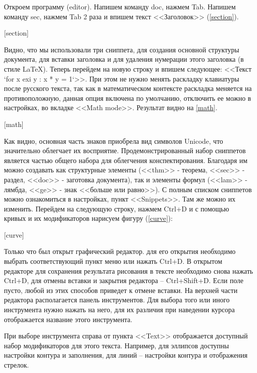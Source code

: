 \documentclass[opermanual]{espd}
\begin{document}
Откроем программу (editor). Напишем команду doc, нажмем Tab. Напишем команду sec, нажмем Tab 2 раза и впишем текст <<Заголовок>> (\ref{section}).

[section]

Видно, что мы использовали три сниппета, для создания основной структуры документа, для вставки заголовка и для удаления нумерации этого заголовка (в стиле LaTeX). Теперь перейдем на новую строку и впишем следующее: <<Текст `for x exi y : x * y = 1`>>. При этом не нужно менять раскладку клавиатуры после русского текста, так как в математическом контексте раскладка меняется на противоположную, данная опция включена по умолчанию, отключить ее можно в настройках, во вкладке <<Math mode>>. Результат видно на \ref{math}.

[math]

Как видно, основная часть знаков приобрела вид символов Unicode, что значительно облегчает их восприятие. Продемонстрированный набор сниппетов является частью общего набора для облегчения конспектирования. Благодаря им можно создавать как структурные элементы (<<thm>> - теорема, <<sec>> - раздел, <<doc>> - заготовка документа), так и элементы формул (<<lam>> - лямбда, <<ge>> - знак  <<больше или равно>>). С полным списком сниппетов можно ознакомиться в настройках, пункт <<Snippets>>. Там же можно их изменить. Перейдем на следующую строку, нажмем Ctrl+D и с помощью кривых и их модификаторов нарисуем фигуру (\ref{curve}):

[curve]

Только что был открыт графический редактор. для его открытия необходимо выбрать соответствующий пункт меню или нажать Ctrl+D. В открытом редакторе для сохранения результата рисования в тексте необходимо снова нажать Ctrl+D, для отмены вставки и закрытия редактора -- Ctrl+Shift+D. Если поле пусто, любой из этих способов приведет к отмене вставки. На верхней части редактора располагается панель инструментов. Для выбора того или иного инструмента нужно нажать на него, для их различия при наведении курсора отображается название этого инструмента.

При выборе инструмента справа от пункта <<Text>> отображается доступный набор модификаторов для этого текста. Например, для эллипсов доступны настройки контура и заполнения, для линий -- настройки контура и отображения стрелок.
\end{document}
